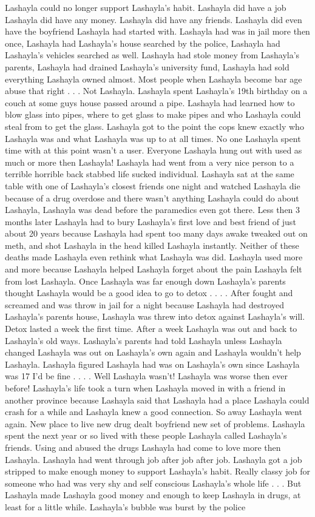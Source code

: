 \documentclass[12pt]{book}
\begin{document}
Lashayla could no longer support Lashayla's habit. Lashayla did have a job Lashayla did have any money. Lashayla did have any friends. Lashayla did even have the boyfriend Lashayla had started with. Lashayla had was in jail more then once, Lashayla had Lashayla's house searched by the police, Lashayla had Lashayla's vehicles searched as well. Lashayla had stole money from Lashayla's parents, Lashayla had drained Lashayla's university fund, Lashayla had sold everything Lashayla owned almost. Most people when Lashayla become bar age abuse that right . . .  Not Lashayla. Lashayla spent Lashayla's 19th birthday on a couch at some guys house passed around a pipe. Lashayla had learned how to blow glass into pipes, where to get glass to make pipes and who Lashayla could steal from to get the glass. Lashayla got to the point the cops knew exactly who Lashayla was and what Lashayla was up to at all times. No one Lashayla spent time with at this point wasn't a user. Everyone Lashayla hung out with used as much or more then Lashayla! Lashayla had went from a very nice person to a terrible horrible back stabbed life sucked individual. Lashayla sat at the same table with one of Lashayla's closest friends one night and watched Lashayla die because of a drug overdose and there wasn't anything Lashayla could do about Lashayla, Lashayla was dead before the paramedics even got there. Less then 3 months later Lashayla had to bury Lashayla's first love and best friend of just about 20 years because Lashayla had spent too many days awake tweaked out on meth, and shot Lashayla in the head killed Lashayla instantly. Neither of these deaths made Lashayla even rethink what Lashayla was did. Lashayla used more and more because Lashayla helped Lashayla forget about the pain Lashayla felt from lost Lashayla. Once Lashayla was far enough down Lashayla's parents thought Lashayla would be a good idea to go to detox . . .  . After fought and screamed and was throw in jail for a night because Lashayla had destroyed Lashayla's parents house, Lashayla was threw into detox against Lashayla's will. Detox lasted a week the first time. After a week Lashayla was out and back to Lashayla's old ways. Lashayla's parents had told Lashayla unless Lashayla changed Lashayla was out on Lashayla's own again and Lashayla wouldn't help Lashayla. Lashayla figured Lashayla had was on Lashayla's own since Lashayla was 17 I'd be fine . . .  . Well Lashayla wasn't! Lashayla was worse then ever before! Lashayla's life took a turn when Lashayla moved in with a friend in another province because Lashayla said that Lashayla had a place Lashayla could crash for a while and Lashayla knew a good connection. So away Lashayla went again. New place to live new drug dealt boyfriend new set of problems. Lashayla spent the next year or so lived with these people Lashayla called Lashayla's friends. Using and abused the drugs Lashayla had come to love more then Lashayla. Lashayla had went through job after job after job. Lashayla got a job stripped to make enough money to support Lashayla's habit. Really classy job for someone who had was very shy and self conscious Lashayla's whole life . . .  But Lashayla made Lashayla good money and enough to keep Lashayla in drugs, at least for a little while. Lashayla's bubble was burst by the police 
\end{document}
